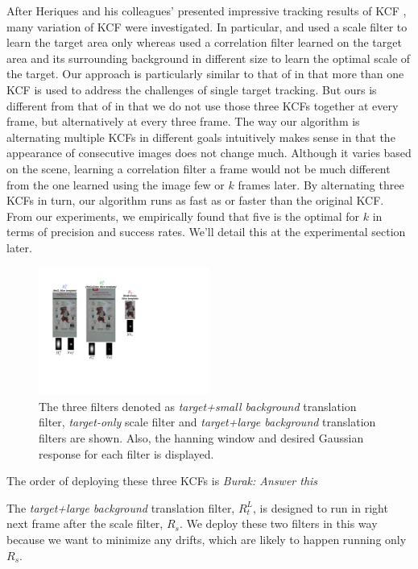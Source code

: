 \documentclass{bmvc2k}
\begin{document}
After Heriques and his colleagues' presented impressive tracking
results of KCF \cite{henriques2015high}, many variation of KCF were
investigated. In particular, \cite{ma2015long} and
\cite{danelljan2014accurate} used a scale filter to learn the target
area only whereas \cite{li2014scale, bibi2015multi, tang2015multi}
used a correlation filter learned on the target area and its
surrounding background in different size to learn the optimal scale of
the target. Our approach is particularly similar to that of
\cite{ma2015long} in that more than one KCF is used to address the
challenges of single target tracking. But ours is different from that
of \cite{ma2015long} in that we do not use those three KCFs together
at every frame, but alternatively at every three frame. The way our
algorithm is alternating multiple KCFs in different goals intuitively
makes sense in that the appearance of consecutive images does not
change much. Although it varies based on the scene, learning a
correlation filter a frame would not be much different from the one
learned using the image few or $k$ frames later. By alternating three
KCFs in turn, our algorithm runs as fast as or faster than the
original KCF. From our experiments, we empirically found that five is
the optimal for $k$ in terms of precision and success rates. We'll
detail this at the experimental section later.

\begin{figure}[!t]
\centering
\includegraphics[width=0.5\textwidth]{figures/Filters_Details.pdf}
\caption{The three filters denoted as \textit{target+small background} translation filter,
  \textit{target-only} scale filter and \textit{target+large background} translation filters are
  shown. Also, the hanning window and desired Gaussian response for
  each filter is displayed.}
\label{fig:Filters}
\end{figure}

The order of deploying these three KCFs is {\it Burak: Answer this}

The \textit{target+large background} translation filter, $R_{t}^{L}$,
is designed to run in right next frame after the scale filter,
$R_s$. We deploy these two filters in this way because we want to
minimize any drifts, which are likely to happen running only $R_{s}$.
\end{document}
